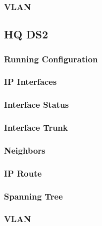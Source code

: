 \subsubsection{VLAN}





\subsection{HQ DS2}
\subsubsection{Running Configuration}


\subsubsection{IP Interfaces}


\subsubsection{Interface Status}


\subsubsection{Interface Trunk}


\subsubsection{Neighbors}


\subsubsection{IP Route}


\subsubsection{Spanning Tree}


\subsubsection{VLAN}






